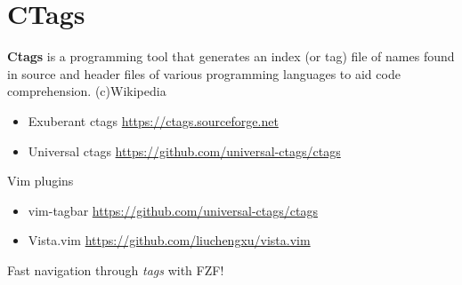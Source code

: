 \documentclass[aspectratio=169]{beamer}
\newcommand{\myurl}[1]{{\color{indigo}\url{#1}}}%
\begin{document}
\section*{CTags}
\begin{frame}{\secname}
  \textbf{Ctags} is a programming tool that generates an index (or tag) file of names found in source and header files of various programming languages to aid code comprehension. (c)Wikipedia
  \begin{itemize}

    \item Exuberant ctags \myurl{https://ctags.sourceforge.net}
    \item Universal ctags \myurl{https://github.com/universal-ctags/ctags}

  \end{itemize}

  \begin{block}{Vim plugins}
    \begin{itemize}
      \item vim-tagbar \myurl{https://github.com/universal-ctags/ctags}
      \item Vista.vim \myurl{https://github.com/liuchengxu/vista.vim}
    \end{itemize} 
  \end{block}
  Fast navigation through \textit{tags} with FZF!
  	
\end{frame}

\end{document}
